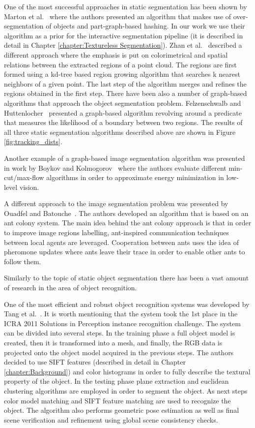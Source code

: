 One of the most successful approaches in static segmentation has been shown by Marton et al.~\cite{marton12SC} where the authors presented an algorithm that makes use of over-segmentation of objects and part-graph-based hashing. In our work we use their algorithm as a prior for the interactive segmentation pipeline (it is described in detail in Chapter \ref{chapter:Textureless Segmentation}). Zhan et al.~\cite{RGBRegionGrowing} described a different approach where the emphasis is put on colorimetrical and spatial relations between the extracted regions of a point cloud. The regions are first formed using a kd-tree based region growing algorithm that searches k nearest neighbors of a given point. The last step of the algorithm merges and refines the regions obtained in the first step. There have been also a number of graph-based algorithms that approach the object segmentation problem. Felzenschwalb and Huttenlocher~\cite{Felzenszwalb} presented a graph-based algorithm revolving around a predicate that measures the likelihood of a boundary between two regions.
The results of all three static segmentation algorithms described above are shown in Figure \ref{fig:tracking_dists}.  

Another example of a graph-based image segmentation algorithm was presented in work by Boykov and Kolmogorov~\cite{BoykovGraphCut} where the authors evaluate different min-cut/max-flow algorithms in order to approximate energy minimization in low-level vision. 

A different approach to the image segmentation problem was presented by Ouadfel and Batouche~\cite{ouadfel2003mrf}. The authors developed an algorithm that is based on an ant colony system. The main idea behind the ant colony approach is that in order to improve image regions labelling, ant-inspired communication techniques between local agents are leveraged. Cooperation between ants uses the idea of pheromone updates where ants leave their trace in order to enable other ants to follow them.  
 
Similarly to the topic of static object segmentation there has been a vast amount of research in the area of object recognition. 

One of the most efficient and robust object recognition systems was developed by Tang et al.~\cite{tang2012textured}. It is worth mentioning that the system took the 1st place in the ICRA 2011 Solutions in Perception instance recognition challenge. The system can be divided into several steps. In the training phase a full object model is created, then it is transformed into a mesh, and finally, the RGB data is projected onto the object model acquired in the previous steps. The authors decided to use SIFT features (described in detail in Chapter \ref{chapter:Background}) and color histograms in order to fully describe the textural property of the object. In the testing phase plane extraction and euclidean clustering algorithms are employed in order to segment the object. As next steps color model matching and SIFT feature matching are used to recognize the object. The algorithm also performs geometric pose estimation as well as final scene verification and refinement using global scene consistency checks. 

